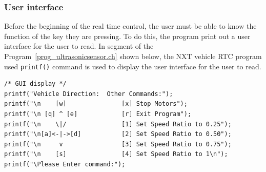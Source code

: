 \documentclass[11pt]{article}
\begin{document}
\subsubsection*{User interface}
Before the beginning of the real time control, the user must be able to know the 
function of the key they are pressing. To do this, the program print out a user 
interface for the user to read. In segment of the Program~\ref{prog_ultrasonicsensor.ch} 
shown below, the NXT vehicle RTC program used {\tt printf()} command is used to 
display the user interface for the user to read.
\begin{lstlisting}
/* GUI display */
printf("Vehicle Direction:  Other Commands:");
printf("\n    [w]               [x] Stop Motors");
printf("\n [q] ^ [e]            [r] Exit Program");
printf("\n    \|/               [1] Set Speed Ratio to 0.25");
printf("\n[a]<-|->[d]           [2] Set Speed Ratio to 0.50");
printf("\n     v                [3] Set Speed Ratio to 0.75");
printf("\n    [s]               [4] Set Speed Ratio to 1\n");
printf("\Please Enter command:");
\end{lstlisting}
\end{document}
